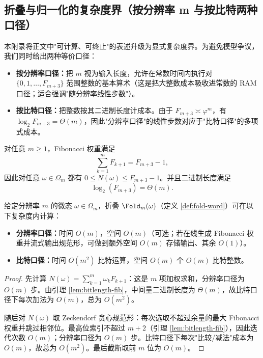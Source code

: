\subsection{折叠与归一化的复杂度界（按分辨率 m 与按比特两种口径）}
\label{subsec:normalization-complexity-bounds}

本附录将正文中"可计算、可终止"的表述升级为显式复杂度界。为避免模型争议，我们同时给出两种等价口径：
\begin{itemize}
  \item \textbf{按分辨率口径：}把 $m$ 视为输入长度，允许在常数时间内执行对 $\{0,1,\dots,F_{m+3}\}$ 范围整数的基本算术（这是把大整数成本吸收进常数的 RAM 口径；适合强调"随分辨率线性步数"）。
  \item \textbf{按比特口径：}把整数按其二进制长度计成本。由于 $F_{m+3}\asymp \varphi^{m}$，有 $\log_2 F_{m+3}=\Theta(m)$，因此"分辨率口径"的线性步数对应于"比特口径"的多项式成本。
\end{itemize}

\begin{lemma}[权重与数值大小]\label{lem:bitlength-fib}
对任意 $m\ge 1$，Fibonacci 权重满足
\[
\sum_{k=1}^m F_{k+1}=F_{m+3}-1,
\]
因此对任意 $\omega\in\Omega_m$ 都有 $0\le N(\omega)\le F_{m+3}-1$。并且二进制长度满足
\[
\log_2(F_{m+3})=\Theta(m).
\]
\end{lemma}

\begin{proposition}\label{prop:fold-complexity}
给定分辨率 $m$ 的微态 $\omega\in\Omega_m$，折叠 $\Fold_m(\omega)$（定义 \ref{def:fold-word}）可在以下复杂度内计算：
\begin{itemize}
  \item \textbf{分辨率口径：}时间 $O(m)$，空间 $O(m)$（可选；若在线生成 Fibonacci 权重并流式输出规范形，可做到额外空间 $O(m)$ 存储输出、其余 $O(1)$）。
  \item \textbf{比特口径：}时间 $O(m^2)$ 比特运算，空间 $O(m)$ 个 $O(m)$ 比特整数。
\end{itemize}
\end{proposition}

\begin{proof}
先计算 $N(\omega)=\sum_{k=1}^m \omega_k F_{k+1}$：这是 $m$ 项加权求和，分辨率口径为 $O(m)$ 步。由引理 \ref{lem:bitlength-fib}，中间量二进制长度为 $\Theta(m)$，故比特口径下每次加法为 $O(m)$，总为 $O(m^2)$。

随后对 $N(\omega)$ 取 Zeckendorf 贪心规范形：每次选取不超过余量的最大 Fibonacci 权重并跳过相邻位。最高位索引不超过 $m+2$（引理 \ref{lem:bitlength-fib}），因此迭代次数 $O(m)$；分辨率口径为 $O(m)$ 步。比特口径下每次"比较/减法"成本为 $O(m)$，故总为 $O(m^2)$。最后截断取前 $m$ 位为 $O(m)$。
\end{proof}


